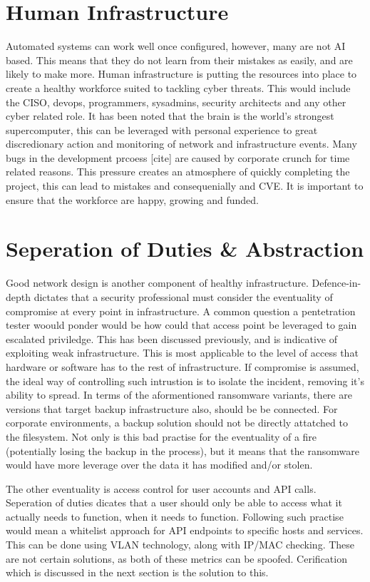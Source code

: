 \section{Human Infrastructure}
Automated systems can work well once configured, however, many are not AI based. This means that they do not learn from their mistakes as easily, and are likely to make more. Human infrastructure is putting the resources into place to create a healthy workforce suited to tackling cyber threats. This would include the CISO, devops, programmers, sysadmins, security architects and any other cyber related role.
It has been noted that the brain is the world's strongest supercomputer, this can be leveraged with personal experience to great discredionary action and monitoring of network and infrastructure events. Many bugs in the development prcoess [cite] are caused by corporate crunch for time related reasons. This pressure creates an atmosphere of quickly completing the project, this can lead to mistakes and consequenially and CVE.
It is important to ensure that the workforce are happy, growing and funded.


\section{Seperation of Duties \& Abstraction}
Good network design is another component of healthy infrastructure. Defence-in-depth dictates that a security professional must consider the eventuality of compromise at every point in infrastructure. A common question a pentetration tester woould ponder would be how could that access point be leveraged to gain escalated priviledge. This has been discussed previously, and is indicative of exploiting weak infrastructure. 
This is most applicable to the level of access that hardware or software has to the rest of infrastructure. If compromise is assumed, the ideal way of controlling such intrustion is to isolate the incident, removing it's ability to spread. In terms of the aformentioned ransomware variants, there are versions that target backup infrastructure also, should be be connected. For corporate environments, a backup solution should not be directly attatched to the filesystem.
Not only is this bad practise for the eventuality of a fire (potentially losing the backup in the process), but it means that the ransomware would have more leverage over the data it has modified and/or stolen.

The other eventuality is access control for user accounts and API calls. Seperation of duties dicates that a user should only be able to access what it actually needs to function, when it needs to function. Following such practise would mean a whitelist approach for API endpoints to specific hosts and services.
This can be done using VLAN technology, along with IP/MAC checking. These are not certain solutions, as both of these metrics can be spoofed. Cerification which is discussed in the next section is the solution to this.

